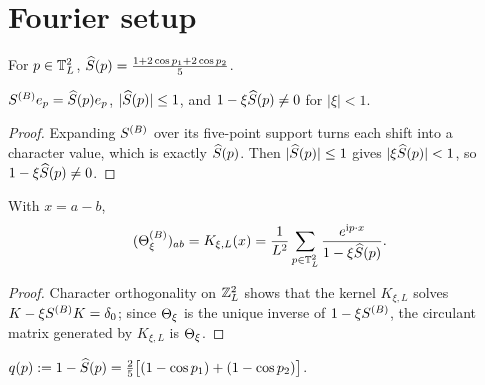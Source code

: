 \section{Fourier setup}

\begin{definition}\label{def:Shat}
  \leanok{}
  For $p\in\mathbb{T}_L^2$,
  $\widehat{S}(p)=\frac{1+2\cos p_1+2\cos p_2}{5}$.
\end{definition}

\begin{lemma}\label{lem:eigen}
  \leanok
  $S^{(B)} e_p=\widehat{S}(p)e_p$, $|\widehat{S}(p)|\le1$, and $1-\xi\widehat{S}(p)\ne0$ for $|\xi|<1$.
\end{lemma}
\begin{proof}\leanok
  Expanding $S^{(B)}$ over its five-point support turns each shift into a character
  value, which is exactly $\widehat{S}(p)$.  Then $|\widehat{S}(p)|\le1$ gives
  $|\xi\widehat{S}(p)|<1$, so $1-\xi\widehat{S}(p)\ne0$.
\end{proof}

\begin{lemma}\label{lem:fourier}
  \leanok
  With $x=a-b$,
  \[ (\Theta^{(B)}_\xi)_{ab}=K_{\xi,L}(x)=\frac1{L^2}\sum_{p\in\mathbb{T}_L^2}
     \frac{e^{\mathrm{i}p\cdot x}}{1-\xi\widehat{S}(p)} . \]
\end{lemma}
\begin{proof}\leanok
  Character orthogonality on $\mathbb{Z}_L^2$ shows that the kernel $K_{\xi,L}$ solves
  $K-\xi S^{(B)} K=\delta_0$; since $\Theta_\xi$ is the unique inverse of $1-\xi S^{(B)}$, the
  circulant matrix generated by $K_{\xi,L}$ is $\Theta_\xi$.
\end{proof}

\begin{definition}\label{def:q}
  \leanok{}
  $q(p):=1-\widehat{S}(p)=\frac25\big[(1-\cos p_1)+(1-\cos p_2)\big]$.
\end{definition}


